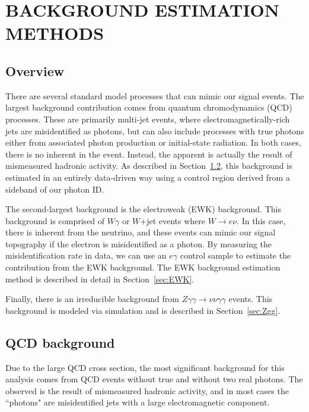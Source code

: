 \chapter{BACKGROUND ESTIMATION METHODS}
\label{chap:DataAnalysis}

\section{Overview}

There are several standard model processes that can mimic our signal events. The largest background contribution comes from quantum chromodynamics (QCD) processes. These are primarily multi-jet events, where electromagnetically-rich jets are misidentified as photons, but can also include processes with true photons either from associated photon production or initial-state radiation. In both cases, there is no inherent \ETmiss in the event. Instead, the apparent \ETmiss is actually the result of mismeasured hadronic activity. As described in Section~\ref{sec:QCD}, this background is estimated in an entirely data-driven way using a control region derived from a sideband of our photon ID. 

The second-largest background is the electroweak (EWK) background. This background is comprised of $W\gamma$ or $W$+jet events where $W\rightarrow e \nu$. In this case, there is inherent \ETmiss from the neutrino, and these events can mimic our signal topography if the electron is misidentified as a photon. By measuring the misidentification rate in data, we can use an $e\gamma$ control sample to estimate the contribution from the EWK background. The EWK background estimation method is described in detail in Section~\ref{sec:EWK}. 

Finally, there is an irreducible background from $Z\gamma\gamma\rightarrow\nu\nu\gamma\gamma$ events. This background is modeled via simulation and is described in Section~\ref{sec:Zgg}.


\section{QCD background}
\label{sec:QCD}

Due to the large QCD cross section, the most significant background for this analysis 
comes from QCD events without true \ETmiss and without two real photons. 
The observed \ETmiss is the result of mismeasured hadronic activity, and in most cases the 
``photons" are misidentified jets with a large electromagnetic component.

